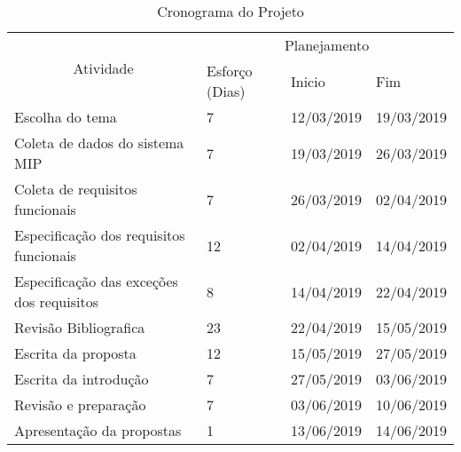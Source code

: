 \begin{table}[H]
\centering
\caption{Cronograma do Projeto}
\label{crono}
\begin{tabular}{|l|l|l|l|}
\hline
\multicolumn{1}{|c|}{\multirow{3}{*}{Atividade}} & \multicolumn{3}{c|}{Planejamento}                                                \\ \cline{2-4} 
\multicolumn{1}{|c|}{}                           & \multirow{2}{*}{Esforço (Dias)} & \multirow{2}{*}{Inicio} & \multirow{2}{*}{Fim} \\
\multicolumn{1}{|c|}{}                           &                                 &                         &                      \\ \hline
Escolha do tema                                  & 7                               & 12/03/2019              & 19/03/2019           \\ \hline
Coleta de dados do sistema MIP                   & 7                               & 19/03/2019              & 26/03/2019           \\ \hline
Coleta de requisitos funcionais                  & 7                               & 26/03/2019              & 02/04/2019           \\ \hline
Especificação dos requisitos funcionais          & 12                              & 02/04/2019              & 14/04/2019           \\ \hline
Especificação das exceções dos requisitos         & 8                               & 14/04/2019              & 22/04/2019           \\ \hline
Revisão Bibliografica                            & 23                              & 22/04/2019              & 15/05/2019           \\ \hline
Escrita da proposta                              & 12                              & 15/05/2019              & 27/05/2019           \\ \hline
Escrita da introdução                            & 7                               & 27/05/2019              & 03/06/2019           \\ \hline
Revisão e preparação                             & 7                               & 03/06/2019              & 10/06/2019           \\ \hline
Apresentação da propostas                        & 1                               & 13/06/2019              & 14/06/2019           \\ \hline

\end{tabular}
\end{table}
